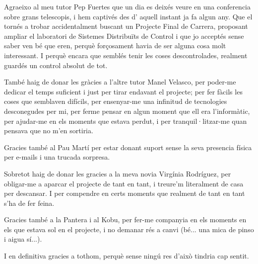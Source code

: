 

\begin{acknowledgements}      %

Agraeixo al meu tutor Pep Fuertes que un dia es deixés veure en una conferencia sobre grans telescopis, i hem captivés des d' aquell instant ja fa algun any. 
Que el tornés a trobar accidentalment buscant un Projecte Final de Carrera, proposant ampliar el laboratori de Sistemes Distribuïts de Control i que jo acceptés sense saber ven bé que eren, perquè forçosament havia de ser alguna cosa molt interessant. I perquè encara que semblés tenir les coses descontrolades, realment guardés un control absolut de tot.

També haig de donar les gràcies a l'altre tutor Manel Velasco, per poder-me dedicar el temps suficient i just per tirar endavant el projecte; per fer fàcils les coses que semblaven difícils, per ensenyar-me una infinitud de tecnologies desconegudes per mi, per ferme pensar en algun moment que ell era l'informàtic, per ajudar-me en els moments que estava perdut, i per tranquil·litzar-me quan pensava que no m'en sortiria.

Gracies també al Pau Martí per estar donant suport sense la seva presencia física per e-mails i una trucada sorpresa. 

Sobretot haig de donar les gracies a la meva novia Virgínia Rodríguez, per obligar-me a aparcar el projecte de tant en tant, i treure'm literalment de casa per descansar. I per compendre en certs moments que realment de tant en tant s'ha de fer feina.

Gracies també a la Pantera i al Kobu, per fer-me companyia en els moments en els que estava sol en el projecte, i no demanar rés a canvi (bé... una mica de pinso i aigua sí...).

I en definitiva gracies a tothom, perquè sense ningú res d'això tindria cap sentit.

\end{acknowledgements}




